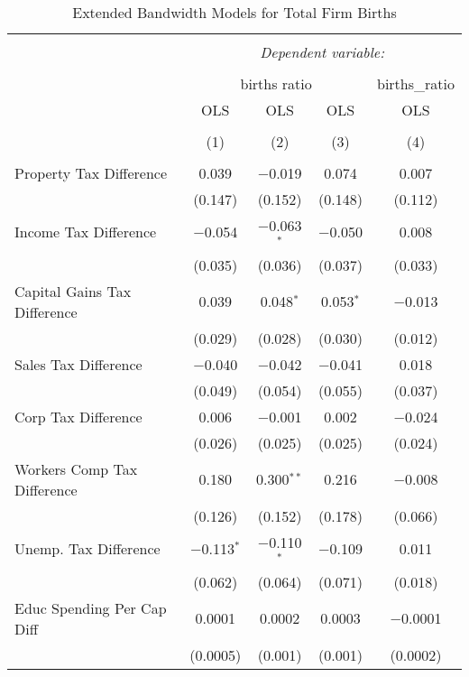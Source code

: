 
\begin{table}[!htbp] \centering 
  \caption{Extended Bandwidth Models for  Total Firm Births} 
  \label{--eb} 
\begin{tabular}{@{\extracolsep{5pt}}lcccc} 
\\[-1.8ex]\hline 
\hline \\[-1.8ex] 
 & \multicolumn{4}{c}{\textit{Dependent variable:}} \\ 
\cline{2-5} 
\\[-1.8ex] & \multicolumn{3}{c}{births ratio} & births\_ratio \\ 
 & OLS & OLS & OLS & OLS \\ 
\\[-1.8ex] & (1) & (2) & (3) & (4)\\ 
\hline \\[-1.8ex] 
 Property Tax Difference & 0.039 & $-$0.019 & 0.074 & 0.007 \\ 
  & (0.147) & (0.152) & (0.148) & (0.112) \\ 
  Income Tax Difference & $-$0.054 & $-$0.063$^{*}$ & $-$0.050 & 0.008 \\ 
  & (0.035) & (0.036) & (0.037) & (0.033) \\ 
  Capital Gains Tax Difference & 0.039 & 0.048$^{*}$ & 0.053$^{*}$ & $-$0.013 \\ 
  & (0.029) & (0.028) & (0.030) & (0.012) \\ 
  Sales Tax Difference & $-$0.040 & $-$0.042 & $-$0.041 & 0.018 \\ 
  & (0.049) & (0.054) & (0.055) & (0.037) \\ 
  Corp Tax Difference & 0.006 & $-$0.001 & 0.002 & $-$0.024 \\ 
  & (0.026) & (0.025) & (0.025) & (0.024) \\ 
  Workers Comp Tax Difference & 0.180 & 0.300$^{**}$ & 0.216 & $-$0.008 \\ 
  & (0.126) & (0.152) & (0.178) & (0.066) \\ 
  Unemp. Tax Difference & $-$0.113$^{*}$ & $-$0.110$^{*}$ & $-$0.109 & 0.011 \\ 
  & (0.062) & (0.064) & (0.071) & (0.018) \\ 
  Educ Spending Per Cap Diff & 0.0001 & 0.0002 & 0.0003 & $-$0.0001 \\ 
  & (0.0005) & (0.001) & (0.001) & (0.0002) \\ 

\end{tabular}
\end{table}
